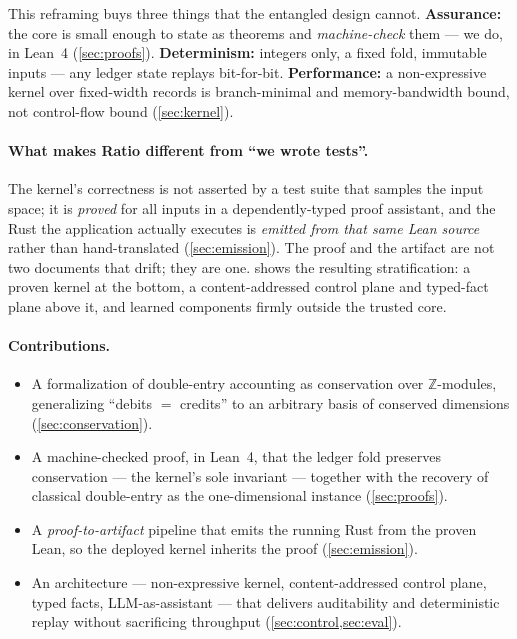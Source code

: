 This reframing buys three things that the entangled design cannot.
\textbf{Assurance:} the core is small enough to state as theorems and
\emph{machine-check} them --- we do, in Lean~4 (\cref{sec:proofs}).
\textbf{Determinism:} integers only, a fixed fold, immutable inputs ---
any ledger state replays bit-for-bit. \textbf{Performance:} a
non-expressive kernel over fixed-width records is branch-minimal and
memory-bandwidth bound, not control-flow bound (\cref{sec:kernel}).

\paragraph{What makes Ratio different from ``we wrote tests''.} The
kernel's correctness is not asserted by a test suite that samples the
input space; it is \emph{proved} for all inputs in a dependently-typed
proof assistant, and the Rust the application actually executes is
\emph{emitted from that same Lean source} rather than hand-translated
(\cref{sec:emission}). The proof and the artifact are not two documents
that drift; they are one.  shows the resulting
stratification: a proven kernel at the bottom, a content-addressed
control plane and typed-fact plane above it, and learned components
firmly outside the trusted core.

\paragraph{Contributions.}
\begin{itemize}[leftmargin=1.4em,itemsep=2pt]
  \item A formalization of double-entry accounting as conservation over
        $\mathbb{Z}$-modules, generalizing ``debits $=$ credits'' to an
        arbitrary basis of conserved dimensions (\cref{sec:conservation}).
  \item A machine-checked proof, in Lean~4, that the ledger fold
        preserves conservation --- the kernel's sole invariant ---
        together with the recovery of classical double-entry as the
        one-dimensional instance (\cref{sec:proofs}).
  \item A \emph{proof-to-artifact} pipeline that emits the running Rust
        from the proven Lean, so the deployed kernel inherits the proof
        (\cref{sec:emission}).
  \item An architecture --- non-expressive kernel, content-addressed
        control plane, typed facts, LLM-as-assistant --- that delivers
        auditability and deterministic replay without sacrificing
        throughput (\cref{sec:control,sec:eval}).
\end{itemize}


